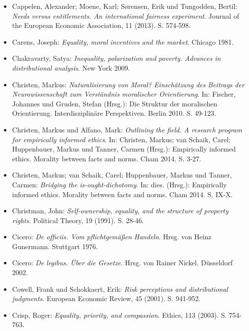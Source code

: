 \documentclass[a4paper]{thesis}
\begin{document}
\begin{itemize}[leftmargin=1.5em,label={},itemindent=-1.5em, itemsep=-1ex]
\item Cappelen, Alexander; Moene, Karl; Sørensen, Erik und Tungodden, Bertil: \textit{Needs versus entitlements. An international fairness experiment}. Journal of the European Economic Association, 11 (2013). S. 574-598.

\item Carens, Joseph: \textit{Equality, moral incentives and the market}. Chicago 1981.

\item Chakravarty, Satya: \textit{Inequality, polarization and poverty. Advances in distributional analysis}. New York 2009.

\item Christen, Markus: \textit{Naturalisierung von Moral? Einschätzung des Beitrags der Neurowissenschaft zum Verständnis moralischer Orientierung}. In: Fischer, Johannes und Gruden, Stefan (Hrsg.): Die Struktur der moralischen Orientierung. Interdisziplinäre Perspektiven. Berlin 2010. S. 49-123.

\item Christen, Markus und Alfano, Mark: \textit{Outlining the field. A research program for empirically informed ethics}. In: Christen, Markus; van Schaik, Carel; Huppenbauer, Markus und Tanner, Carmen (Hrsg.): Empirically informed ethics. Morality between facts and norms. Cham 2014. S. 3-27.

\item Christen, Markus; van Schaik, Carel; Huppenbauer, Markus und Tanner, Carmen: \textit{Bridging the is-ought-dichotomy}. In: dies. (Hrsg.): Empirically informed ethics. Morality between facts and norms. Cham 2014. S. IX-X.

\item Christman, John: \textit{Self-ownership, equality, and the structure of property rights}. Political Theory, 19 (1991). S. 28-46.

\item Cicero: \textit{De officiis. Vom pflichtgemäßen Handeln}. Hrsg. von Heinz Gunermann. Stuttgart 1976.

\item Cicero: \textit{De legibus. Über die Gesetze}. Hrsg. von Rainer Nickel. Düsseldorf 2002.

\item Cowell, Frank und Schokkaert, Erik: \textit{Risk perceptions and distributional judgments}. European Economic Review, 45 (2001). S. 941-952.

\item Crisp, Roger: \textit{Equality, priority, and compassion}. Ethics, 113 (2003). S. 754-763.


\end{itemize}
\end{document}
